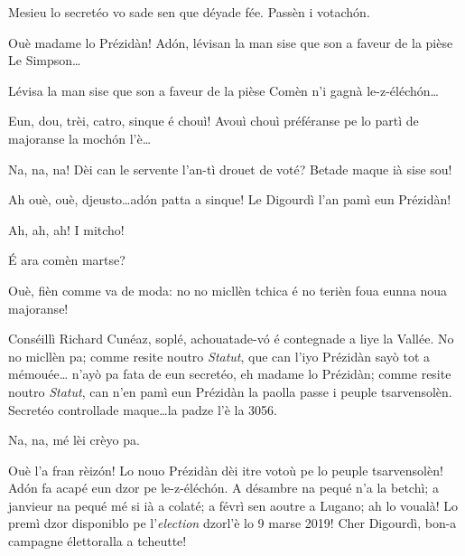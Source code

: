 \begin{drama}
\Presidanspeaks Mesieu lo secretéo vo sade sen que déyade fée. Passèn i votach\'on.

\Secreteospeaks Ouè madame lo Prézidàn! Ad\'on, lévisan la man sise que son a faveur de la pièse \og Le Simpson\fg\ldots


\Secreteospeaks Lévisa la man sise que son a faveur de la pièse \og Comèn n'i gagnà le-z-éléch\'on\fg\ldots


\Secreteospeaks Eun, dou, trèi, catro, sinque  é chouì! Avouì chouì préféranse pe lo partì de majoranse la moch\'on l’è\ldots

\Sophiespeaks {}
Na, na, na! Dèi can le servente l'an-tì drouet de
voté?  Betade maque ià sise sou!

\Secreteospeaks  {} Ah ouè, ouè, djeusto\ldots ad\'on patta a sinque! Le Digourdì l’an pamì eun Prézidàn!

\Cimaspeaks Ah, ah, ah! I mitcho!

\Eyviaspeaks \'E ara comèn martse?

\Richardspeaks Ouè, fièn comme va de moda: no no micllèn tchica é no terièn foua eunna noua majoranse!

\Jordyspeaks Conséillì Richard Cunéaz, soplé, achouatade-v\'o é con\-te\-gna\-de a liye la Vallée. No no micllèn pa; comme resite noutro \textit{Statut}, que can l'iyo Prézidàn sayò tot a mémouée\ldots {} n'ayò pa fata de eun secretéo, eh madame lo Prézidàn; comme resite noutro \textit{Statut}, can n'en pamì eun Prézidàn la paolla passe i peuple tsarvensolèn. Secretéo controllade maque\ldots la padze l'è la 3056.

\Secreteospeaks Na, na, mé lèi crèyo pa.


\Secreteospeaks Ouè l'a fran rèiz\'on! Lo nouo Prézidàn dèi itre votoù pe lo peuple tsarvensolèn! Ad\'on fa acapé eun dzor pe le-z-éléch\'on.  A désambre na pequé n'a la be\-tchì; a janvieur na pequé mé si ià a colaté; a févrì sen aoutre a Lugano; ah lo voualà! Lo premì dzor disponiblo pe \og l’\textit{election} dzor\fg l’è lo 9 marse 2019! Cher Digourdì, bon-a campagne élettoralla a tcheutte!


\end{drama}
